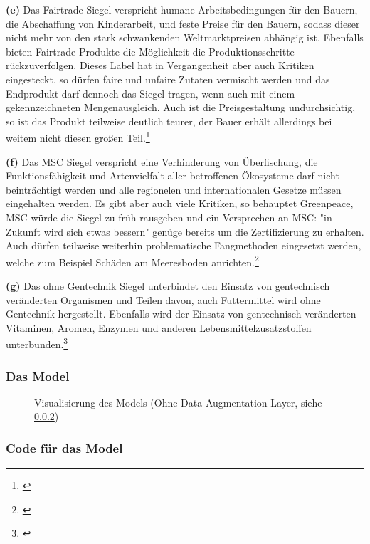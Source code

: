 \noindent\textbf{(e)} Das Fairtrade Siegel verspricht humane Arbeitsbedingungen für den Bauern, die Abschaffung von Kinderarbeit, und feste Preise für den Bauern, sodass dieser nicht mehr von den stark schwankenden Weltmarktpreisen abhängig ist. Ebenfalls bieten Fairtrade Produkte die Möglichkeit die Produktionsschritte rückzuverfolgen. Dieses Label hat in Vergangenheit aber auch Kritiken eingesteckt, so dürfen faire und unfaire Zutaten vermischt werden und das Endprodukt darf dennoch das Siegel tragen, wenn auch mit einem gekennzeichneten Mengenausgleich. Auch ist die Preisgestaltung undurchsichtig, so ist das Produkt teilweise deutlich teurer, der Bauer erhält allerdings bei weitem nicht diesen großen Teil.\footnote{\cite{fairtrade}}

\noindent\textbf{(f)} Das MSC Siegel verspricht eine Verhinderung von Überfischung, die Funktionsfähigkeit und Artenvielfalt aller betroffenen Ökosysteme darf nicht beinträchtigt werden und alle regionelen und internationalen Gesetze müssen eingehalten werden. Es gibt aber auch viele Kritiken, so behauptet Greenpeace, MSC würde die Siegel zu früh rausgeben und ein Versprechen an MSC: "in Zukunft wird sich etwas bessern" genüge bereits um die Zertifizierung zu erhalten. Auch dürfen teilweise weiterhin problematische Fangmethoden eingesetzt werden, welche zum Beispiel Schäden am Meeresboden anrichten.\footnote{\cite{msc}}

\noindent\textbf{(g)} Das ohne Gentechnik Siegel unterbindet den Einsatz von gentechnisch veränderten Organismen und Teilen davon, auch Futtermittel wird ohne Gentechnik hergestellt. Ebenfalls wird der Einsatz von gentechnisch veränderten Vitaminen, Aromen, Enzymen und anderen Lebensmittelzusatzstoffen unterbunden.\footnote{\cite{ohneGentechnik}}

\subsubsection{Das Model}\label{anhang:model}

\begin{figure}[H]
    \centering
    \caption{Visualisierung des Models (Ohne Data Augmentation Layer, siehe \ref{tfcode})}
  \end{figure}

\subsubsection{Code für das Model}\label{tfcode}

